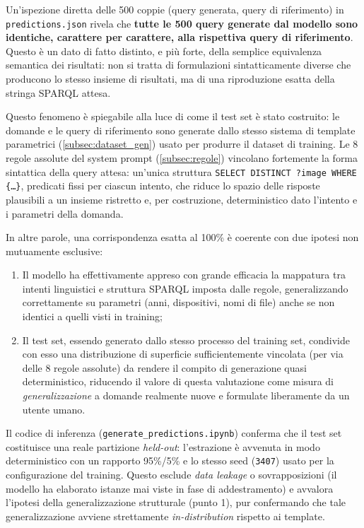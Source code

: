 \documentclass[12pt,a4paper,oneside]{book}
\newcommand{\code}[1]{\colorbox{light-gray}{\texttt{#1}}}
\begin{document}
Un'ispezione diretta delle 500 coppie (query generata, query di riferimento) in \code{predictions.json} rivela che \textbf{tutte le 500 query generate dal modello sono identiche, carattere per carattere, alla rispettiva query di riferimento}. Questo è un dato di fatto distinto, e più forte, della semplice equivalenza semantica dei risultati: non si tratta di formulazioni sintatticamente diverse che producono lo stesso insieme di risultati, ma di una riproduzione esatta della stringa SPARQL attesa.

Questo fenomeno è spiegabile alla luce di come il test set è stato costruito: le domande e le query di riferimento sono generate dallo stesso sistema di template parametrici (\cref{subsec:dataset_gen}) usato per produrre il dataset di training. Le 8 regole assolute del system prompt (\cref{subsec:regole}) vincolano fortemente la forma sintattica della query attesa: un'unica struttura \code{SELECT DISTINCT ?image WHERE \{\ldots\}}, predicati fissi per ciascun intento, che riduce lo spazio delle risposte plausibili a un insieme ristretto e, per costruzione, deterministico dato l'intento e i parametri della domanda.

In altre parole, una corrispondenza esatta al 100\% è coerente con due ipotesi non mutuamente esclusive:

\begin{enumerate}
    \item Il modello ha effettivamente appreso con grande efficacia la mappatura tra intenti linguistici e struttura SPARQL imposta dalle regole, generalizzando correttamente su parametri (anni, dispositivi, nomi di file) anche se non identici a quelli visti in training;
    \item Il test set, essendo generato dallo stesso processo del training set, condivide con esso una distribuzione di superficie sufficientemente vincolata (per via delle 8 regole assolute) da rendere il compito di generazione quasi deterministico, riducendo il valore di questa valutazione come misura di \emph{generalizzazione} a domande realmente nuove e formulate liberamente da un utente umano.
\end{enumerate}

Il codice di inferenza (\code{generate\_predictions.ipynb}) conferma che il test set costituisce una reale partizione \textit{held-out}: l'estrazione è avvenuta in modo deterministico con un rapporto 95\%/5\% e lo stesso seed (\code{3407}) usato per la configurazione del training. Questo esclude \textit{data leakage} o sovrapposizioni (il modello ha elaborato istanze mai viste in fase di addestramento) e avvalora l'ipotesi della generalizzazione strutturale (punto 1), pur confermando che tale generalizzazione avviene strettamente \textit{in-distribution} rispetto ai template.
\end{document}
